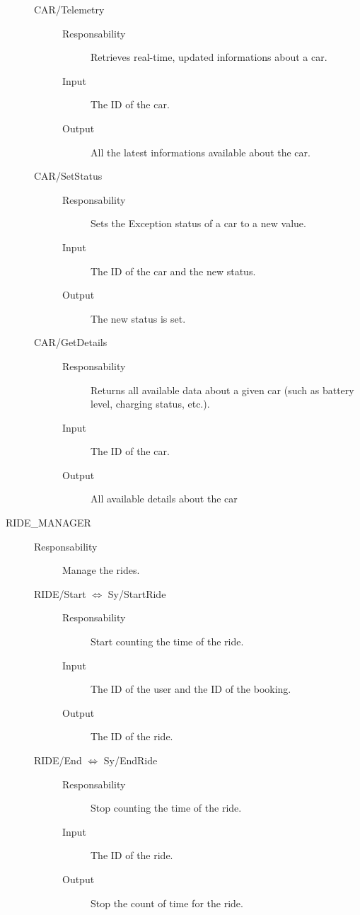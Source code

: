 \documentclass[11pt]{article} %
\begin{document}
\begin{description}
\begin{description}
	\item[CAR/Telemetry] \hfill
		\begin{description}
			\item[Responsability] Retrieves real-time, updated informations about a car.
			\item[Input] The ID of the car.
			\item[Output] All the latest informations available about the car.
		\end{description}

	\item[CAR/SetStatus] \hfill
		\begin{description}
			\item[Responsability] Sets the Exception status of a car to a new value.
			\item[Input] The ID of the car and the new status.
			\item[Output] The new status is set.
		\end{description}

	\item[CAR/GetDetails] \hfill
		\begin{description}
			\item[Responsability] Returns all available data about a given car (such as battery level, charging status, etc.).
			\item[Input] The ID of the car.
			\item[Output] All available details about the car
		\end{description}
	\end{description}
	
	\item[RIDE\_MANAGER] \hfill
	\begin{description}
		\item[Responsability] Manage the rides.

	\item[RIDE/Start $\Leftrightarrow$ Sy/StartRide]  \hfil
		\begin{description}
			\item[Responsability] Start counting the time of the ride.
			\item[Input] The ID of the user and the ID of the booking.
			\item[Output] The ID of the ride.
		\end{description}

	\item[RIDE/End $\Leftrightarrow$ Sy/EndRide] \hfil
		\begin{description}
			\item[Responsability] Stop counting the time of the ride.
			\item[Input] The ID of the ride.
			\item[Output] Stop the count of time for the ride.
		\end{description}


\end{description}
\end{description}
\end{document}

